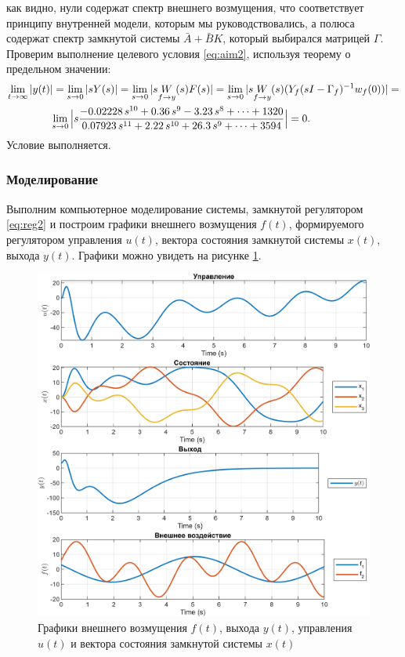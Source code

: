 как видно, нули содержат спектр внешнего возмущения, что 
соответствует принципу внутренней модели, которым мы руководствовались, а полюса
содержат спектр замкнутой системы $\bar A+\bar BK$, который выбирался матрицей $\Gamma$.
Проверим выполнение целевого условия \eqref{eq:aim2}, используя теорему о предельном
значении:
\begin{multline*}
    \lim_{t\rightarrow\infty}|y(t)|=\lim_{s\rightarrow0}|sY(s)|=
    \lim_{s\rightarrow0}|s\underset{f\rightarrow y}{W}(s)F(s)|=
    \lim_{s\rightarrow0}|s\underset{f\rightarrow y}{W}(s)(Y_f(sI-\Gamma_f)^{-1}w_{f}(0))|=\\
    \hspace*{-1.5cm}\lim_{s\rightarrow0}\Big|s\frac{-0.02228\,s^{10} +0.36\,s^9 -3.23\,s^8 +\dots+1320}{0.07923\,s^{11} +2.22\,s^{10} +26.3\,s^9 +\dots+3594}\Big|=0.
\end{multline*}
Условие выполняется.

\subsubsection{Моделирование}

Выполним компьютерное моделирование системы, замкнутой регулятором
\eqref{eq:reg2} и построим графики внешнего возмущения $f(t)$, формируемого 
регулятором управления $u(t)$, вектора состояния замкнутой системы $x(t)$, выхода
$y(t)$. Графики можно увидеть на рисунке \ref{fig:2_0_sim}.

\begin{figure}[H]
    \centering
    \includegraphics[width=\linewidth]{figs/2_0_sim.png}
    \caption{Графики  внешнего возмущения $f(t)$, выхода
    $y(t)$, управления $u(t)$ и вектора состояния замкнутой системы $x(t)$}
    \label{fig:2_0_sim}
\end{figure}



